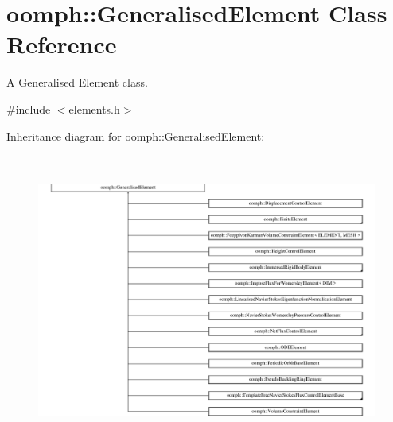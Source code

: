 \hypertarget{classoomph_1_1GeneralisedElement}{}\section{oomph\+:\+:Generalised\+Element Class Reference}
\label{classoomph_1_1GeneralisedElement}


A Generalised Element class.  




{\ttfamily \#include $<$elements.\+h$>$}

Inheritance diagram for oomph\+:\+:Generalised\+Element\+:\begin{figure}[H]
\begin{center}
\leavevmode
\includegraphics[height=9.633027cm]{classoomph_1_1GeneralisedElement}
\end{center}
\end{figure}
